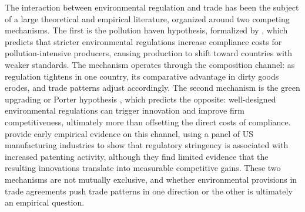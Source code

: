 \documentclass[12pt]{article}
\begin{document}
The interaction between environmental regulation and trade has been the subject of a large theoretical and empirical literature, organized around two competing mechanisms. The first is the pollution haven hypothesis, formalized by \citet{copelandtaylor1994}, which predicts that stricter environmental regulations increase compliance costs for pollution-intensive producers, causing production to shift toward countries with weaker standards. The mechanism operates through the composition channel: as regulation tightens in one country, its comparative advantage in dirty goods erodes, and trade patterns adjust accordingly. The second mechanism is the green upgrading or Porter hypothesis \citep{porter1995}, which predicts the opposite: well-designed environmental regulations can trigger innovation and improve firm competitiveness, ultimately more than offsetting the direct costs of compliance. \citet{jaffe1997} provide early empirical evidence on this channel, using a panel of US manufacturing industries to show that regulatory stringency is associated with increased patenting activity, although they find limited evidence that the resulting innovations translate into measurable competitive gains. These two mechanisms are not mutually exclusive, and whether environmental provisions in trade agreements push trade patterns in one direction or the other is ultimately an empirical question.
\end{document}
